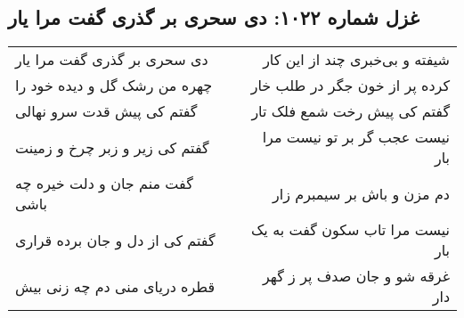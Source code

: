 \begin{center}
\section*{غزل شماره ۱۰۲۲: دی سحری بر گذری گفت مرا یار}
\label{sec:1022}
\begin{longtable}{l p{0.5cm} r}
دی سحری بر گذری گفت مرا یار
&&
شیفته و بی‌خبری چند از این کار
\\
چهره من رشک گل و دیده خود را
&&
کرده پر از خون جگر در طلب خار
\\
گفتم کی پیش قدت سرو نهالی
&&
گفتم کی پیش رخت شمع فلک تار
\\
گفتم کی زیر و زبر چرخ و زمینت
&&
نیست عجب گر بر تو نیست مرا بار
\\
گفت منم جان و دلت خیره چه باشی
&&
دم مزن و باش بر سیمبرم زار
\\
گفتم کی از دل و جان برده قراری
&&
نیست مرا تاب سکون گفت به یک بار
\\
قطره دریای منی دم چه زنی بیش
&&
غرقه شو و جان صدف پر ز گهر دار
\\
\end{longtable}
\end{center}
